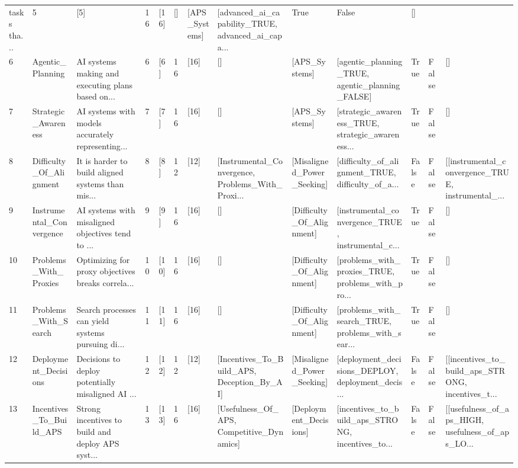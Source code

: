 \documentclass[
  11pt,
  letterpaper,
]{book}
\begin{document}
\begin{longtable}[]{@{}lllllllllllll@{}}
tasks tha... & 5 & {[}5{]} & 16 & {[}16{]} & {[}{]} & {[}APS\_Systems{]}
& {[}advanced\_ai\_capability\_TRUE, advanced\_ai\_capa... & True &
False & {[}{]} \\
6 & Agentic\_Planning & AI systems making and executing plans based
on... & 6 & {[}6{]} & 16 & {[}16{]} & {[}{]} & {[}APS\_Systems{]} &
{[}agentic\_planning\_TRUE, agentic\_planning\_FALSE{]} & True & False &
{[}{]} \\
7 & Strategic\_Awareness & AI systems with models accurately
representing... & 7 & {[}7{]} & 16 & {[}16{]} & {[}{]} &
{[}APS\_Systems{]} & {[}strategic\_awareness\_TRUE,
strategic\_awareness... & True & False & {[}{]} \\
8 & Difficulty\_Of\_Alignment & It is harder to build aligned systems
than mis... & 8 & {[}8{]} & 12 & {[}12{]} &
{[}Instrumental\_Convergence, Problems\_With\_Proxi... &
{[}Misaligned\_Power\_Seeking{]} & {[}difficulty\_of\_alignment\_TRUE,
difficulty\_of\_a... & False & False &
{[}{[}instrumental\_convergence\_TRUE, instrumental\_... \\
9 & Instrumental\_Convergence & AI systems with misaligned objectives
tend to ... & 9 & {[}9{]} & 16 & {[}16{]} & {[}{]} &
{[}Difficulty\_Of\_Alignment{]} & {[}instrumental\_convergence\_TRUE,
instrumental\_c... & True & False & {[}{]} \\
10 & Problems\_With\_Proxies & Optimizing for proxy objectives breaks
correla... & 10 & {[}10{]} & 16 & {[}16{]} & {[}{]} &
{[}Difficulty\_Of\_Alignment{]} & {[}problems\_with\_proxies\_TRUE,
problems\_with\_pro... & True & False & {[}{]} \\
11 & Problems\_With\_Search & Search processes can yield systems
pursuing di... & 11 & {[}11{]} & 16 & {[}16{]} & {[}{]} &
{[}Difficulty\_Of\_Alignment{]} & {[}problems\_with\_search\_TRUE,
problems\_with\_sear... & True & False & {[}{]} \\
12 & Deployment\_Decisions & Decisions to deploy potentially misaligned
AI ... & 12 & {[}12{]} & 12 & {[}12{]} & {[}Incentives\_To\_Build\_APS,
Deception\_By\_AI{]} & {[}Misaligned\_Power\_Seeking{]} &
{[}deployment\_decisions\_DEPLOY, deployment\_decis... & False & False &
{[}{[}incentives\_to\_build\_aps\_STRONG, incentives\_t... \\
13 & Incentives\_To\_Build\_APS & Strong incentives to build and deploy
APS syst... & 13 & {[}13{]} & 16 & {[}16{]} & {[}Usefulness\_Of\_APS,
Competitive\_Dynamics{]} & {[}Deployment\_Decisions{]} &
{[}incentives\_to\_build\_aps\_STRONG, incentives\_to... & False & False
& {[}{[}usefulness\_of\_aps\_HIGH, usefulness\_of\_aps\_LO... \\

\end{longtable}
\end{document}
